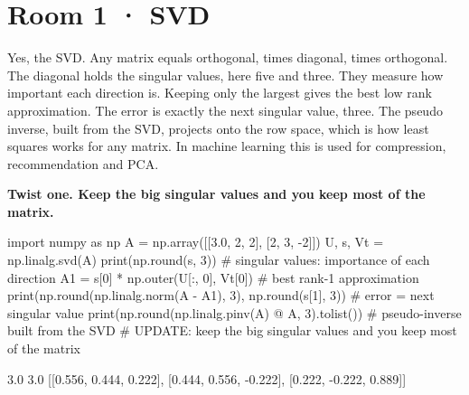\documentclass[11pt,a4paper]{report}
\begin{document}
\section*{Room 1 · SVD}
Yes, the SVD. Any matrix equals orthogonal, times diagonal, times orthogonal. The diagonal holds the singular values, here five and three. They measure how important each direction is. Keeping only the largest gives the best low rank approximation. The error is exactly the next singular value, three. The pseudo inverse, built from the SVD, projects onto the row space, which is how least squares works for any matrix. In machine learning this is used for compression, recommendation and PCA.
\begin{tcolorbox}[colback=yellow!12,colframe=orange!70!black,boxrule=0.4pt,left=4pt,right=4pt,top=2pt,bottom=2pt]\textbf{Twist one. Keep the big singular values and you keep most of the matrix.}\end{tcolorbox}
\begin{Code}
import numpy as np
A = np.array([[3.0, 2, 2], [2, 3, -2]])
U, s, Vt = np.linalg.svd(A)
print(np.round(s, 3))                       # singular values: importance of each direction
A1 = s[0] * np.outer(U[:, 0], Vt[0])        # best rank-1 approximation
print(np.round(np.linalg.norm(A - A1), 3), np.round(s[1], 3))   # error = next singular value
print(np.round(np.linalg.pinv(A) @ A, 3).tolist())              # pseudo-inverse built from the SVD
# UPDATE: keep the big singular values and you keep most of the matrix
\end{Code}
\begin{Out}
[5. 3.]
3.0 3.0
[[0.556, 0.444, 0.222], [0.444, 0.556, -0.222], [0.222, -0.222, 0.889]]
\end{Out}
\end{document}
